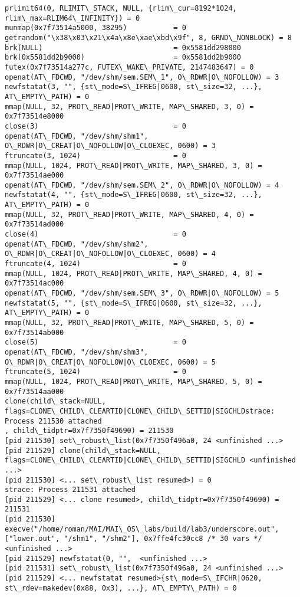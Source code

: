 \documentclass[a4paper, 12pt]{article}
\begin{document}
\begin{lstlisting}
prlimit64(0, RLIMIT\_STACK, NULL, {rlim\_cur=8192*1024, rlim\_max=RLIM64\_INFINITY}) = 0
munmap(0x7f73514a5000, 38295)           = 0
getrandom("\x38\x03\x21\x4a\x8e\xae\xbd\x9f", 8, GRND\_NONBLOCK) = 8
brk(NULL)                               = 0x5581dd298000
brk(0x5581dd2b9000)                     = 0x5581dd2b9000
futex(0x7f73514a277c, FUTEX\_WAKE\_PRIVATE, 2147483647) = 0
openat(AT\_FDCWD, "/dev/shm/sem.SEM\_1", O\_RDWR|O\_NOFOLLOW) = 3
newfstatat(3, "", {st\_mode=S\_IFREG|0600, st\_size=32, ...}, AT\_EMPTY\_PATH) = 0
mmap(NULL, 32, PROT\_READ|PROT\_WRITE, MAP\_SHARED, 3, 0) = 0x7f73514e8000
close(3)                                = 0
openat(AT\_FDCWD, "/dev/shm/shm1", O\_RDWR|O\_CREAT|O\_NOFOLLOW|O\_CLOEXEC, 0600) = 3
ftruncate(3, 1024)                      = 0
mmap(NULL, 1024, PROT\_READ|PROT\_WRITE, MAP\_SHARED, 3, 0) = 0x7f73514ae000
openat(AT\_FDCWD, "/dev/shm/sem.SEM\_2", O\_RDWR|O\_NOFOLLOW) = 4
newfstatat(4, "", {st\_mode=S\_IFREG|0600, st\_size=32, ...}, AT\_EMPTY\_PATH) = 0
mmap(NULL, 32, PROT\_READ|PROT\_WRITE, MAP\_SHARED, 4, 0) = 0x7f73514ad000
close(4)                                = 0
openat(AT\_FDCWD, "/dev/shm/shm2", O\_RDWR|O\_CREAT|O\_NOFOLLOW|O\_CLOEXEC, 0600) = 4
ftruncate(4, 1024)                      = 0
mmap(NULL, 1024, PROT\_READ|PROT\_WRITE, MAP\_SHARED, 4, 0) = 0x7f73514ac000
openat(AT\_FDCWD, "/dev/shm/sem.SEM\_3", O\_RDWR|O\_NOFOLLOW) = 5
newfstatat(5, "", {st\_mode=S\_IFREG|0600, st\_size=32, ...}, AT\_EMPTY\_PATH) = 0
mmap(NULL, 32, PROT\_READ|PROT\_WRITE, MAP\_SHARED, 5, 0) = 0x7f73514ab000
close(5)                                = 0
openat(AT\_FDCWD, "/dev/shm/shm3", O\_RDWR|O\_CREAT|O\_NOFOLLOW|O\_CLOEXEC, 0600) = 5
ftruncate(5, 1024)                      = 0
mmap(NULL, 1024, PROT\_READ|PROT\_WRITE, MAP\_SHARED, 5, 0) = 0x7f73514aa000
clone(child\_stack=NULL, flags=CLONE\_CHILD\_CLEARTID|CLONE\_CHILD\_SETTID|SIGCHLDstrace: Process 211530 attached
, child\_tidptr=0x7f7350f49690) = 211530
[pid 211530] set\_robust\_list(0x7f7350f496a0, 24 <unfinished ...>
[pid 211529] clone(child\_stack=NULL, flags=CLONE\_CHILD\_CLEARTID|CLONE\_CHILD\_SETTID|SIGCHLD <unfinished ...>
[pid 211530] <... set\_robust\_list resumed>) = 0
strace: Process 211531 attached
[pid 211529] <... clone resumed>, child\_tidptr=0x7f7350f49690) = 211531
[pid 211530] execve("/home/roman/MAI/MAI\_OS\_labs/build/lab3/underscore.out", ["lower.out", "/shm1", "/shm2"], 0x7ffe4fc30cc8 /* 30 vars */ <unfinished ...>
[pid 211529] newfstatat(0, "",  <unfinished ...>
[pid 211531] set\_robust\_list(0x7f7350f496a0, 24 <unfinished ...>
[pid 211529] <... newfstatat resumed>{st\_mode=S\_IFCHR|0620, st\_rdev=makedev(0x88, 0x3), ...}, AT\_EMPTY\_PATH) = 0

\end{lstlisting}
\end{document}
